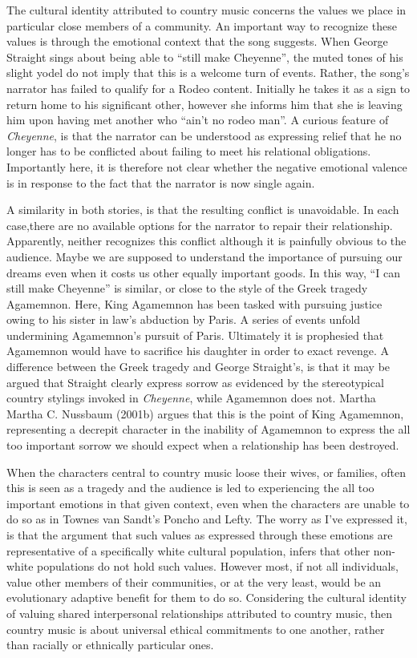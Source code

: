 \documentclass[12pt]{book}
\theoremstyle{definition}
\theoremstyle{remark}
\begin{document}
The cultural identity attributed to country music concerns the values we place in particular close members of a community. An important way to recognize these values is through the emotional context that the song suggests. When George Straight sings about being able to ``still make Cheyenne'', the muted tones of his slight yodel do not imply that this is a welcome turn of events. Rather, the song's narrator has failed to qualify for a Rodeo content. Initially he takes it as a sign to return home to his significant other, however she informs him that she is leaving him upon having met another who ``ain't no rodeo man''. A curious feature of \emph{Cheyenne}, is that the narrator can be understood as expressing relief that he no longer has to be conflicted about failing to meet his relational obligations. Importantly here, it is therefore not clear whether the negative emotional valence is in response to the fact that the narrator is now single again.

A similarity in both stories, is that the resulting conflict is unavoidable. In each case,there are no available options for the narrator to repair their relationship. Apparently, neither recognizes this conflict although it is painfully obvious to the audience. Maybe we are supposed to understand the importance of pursuing our dreams even when it costs us other equally important goods. In this way, ``I can still make Cheyenne'' is similar, or close to the style of the Greek tragedy Agamemnon. Here, King Agamemnon has been tasked with pursuing justice owing to his sister in law's abduction by Paris. A series of events unfold undermining Agamemnon's pursuit of Paris. Ultimately it is prophesied that Agamemnon would have to sacrifice his daughter in order to exact revenge. A difference between the Greek tragedy and George Straight's, is that it may be argued that Straight clearly express sorrow as evidenced by the stereotypical country stylings invoked in \emph{Cheyenne}, while Agamemnon does not. Martha Martha C. Nussbaum (2001b) argues that this is the point of King Agamemnon, representing a decrepit character in the inability of Agamemnon to express the all too important sorrow we should expect when a relationship has been destroyed.

When the characters central to country music loose their wives, or families, often this is seen as a tragedy and the audience is led to experiencing the all too important emotions in that given context, even when the characters are unable to do so as in Townes van Sandt's Poncho and Lefty. The worry as I've expressed it, is that the argument that such values as expressed through these emotions are representative of a specifically white cultural population, infers that other non-white populations do not hold such values. However most, if not all individuals, value other members of their communities, or at the very least, would be an evolutionary adaptive benefit for them to do so. Considering the cultural identity of valuing shared interpersonal relationships attributed to country music, then country music is about universal ethical commitments to one another, rather than racially or ethnically particular ones.
\end{document}
